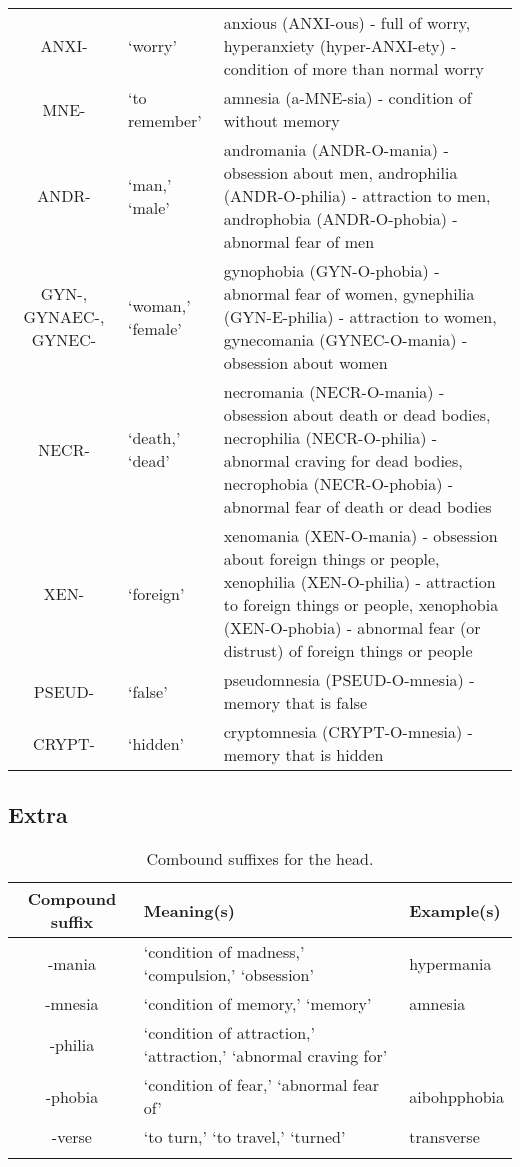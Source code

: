 \begin{longtable}{c | p{} | p{}}
        ANXI- & `worry' & anxious (ANXI-ous) - full of worry, hyperanxiety (hyper-ANXI-ety) - condition of more than normal worry \\
        MNE- & `to remember' & amnesia (a-MNE-sia) - condition of without memory \\
        ANDR- & `man,' `male' & andromania (ANDR-O-mania) - obsession about men, androphilia (ANDR-O-philia) - attraction to men, androphobia (ANDR-O-phobia) - abnormal fear of men \\
        GYN-, GYNAEC-, GYNEC- & `woman,' `female' & gynophobia (GYN-O-phobia) - abnormal fear of women, gynephilia (GYN-E-philia) - attraction to women, gynecomania (GYNEC-O-mania) - obsession about women \\
        NECR- & `death,' `dead' & necromania (NECR-O-mania) - obsession about death or dead bodies, necrophilia (NECR-O-philia) - abnormal craving for dead bodies, necrophobia (NECR-O-phobia) - abnormal fear of death or dead bodies \\
        XEN- & `foreign' & xenomania (XEN-O-mania) - obsession about foreign things or people, xenophilia (XEN-O-philia) - attraction to foreign things or people, xenophobia (XEN-O-phobia) - abnormal fear (or distrust) of foreign things or people \\
        PSEUD- & `false' & pseudomnesia (PSEUD-O-mnesia) - memory that is false \\
        CRYPT- & `hidden' & cryptomnesia (CRYPT-O-mnesia) - memory that is hidden
    \label{tab:Ch3Bases}
\end{longtable}


\subsection{Extra}

\begin{longtable}{c | p{} | p{}}
    \caption{Combound suffixes for the head.}
    \hline
    Compound suffix & Meaning(s) & Example(s) \\ \hline
        -mania & `condition of madness,' `compulsion,' `obsession' & hypermania \\
        -mnesia & `condition of memory,' `memory' & amnesia \\
        -philia & `condition of attraction,' `attraction,' `abnormal craving for' & \\
        -phobia & `condition of fear,' `abnormal fear of' & aibohpphobia \\
        -verse & `to turn,' `to travel,' `turned' & transverse \\
    \label{tab:Ch3Prefix}
\end{longtable}

